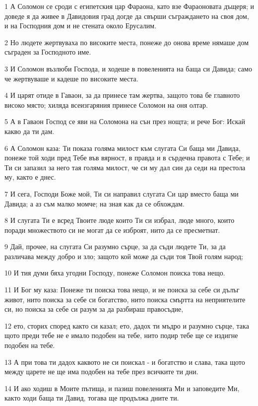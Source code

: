 \par 1 А Соломон се сроди с египетския цар Фараона, като взе Фараоновата дъщеря; и доведе я да живее в Давидовия град догде да свърши съграждането на своя дом, и на Господния дом и не стената около Ерусалим.
\par 2 Но людете жертвуваха по високите места, понеже до онова време нямаше дом съграден за Господното име.
\par 3 И Соломон възлюби Господа, и ходеше в повеленията на баща си Давида; само че жертвуваше и кадеше по високите места.
\par 4 И царят отиде в Гаваон, за да принесе там жертва, защото това бе главното високо място; хиляда всеизгаряния принесе Соломон на оня олтар.
\par 5 А в Гаваон Господ се яви на Соломона на сън през нощта; и рече Бог: Искай какво да ти дам.
\par 6 А Соломон каза: Ти показа голяма милост към слугата Си баща ми Давида, понеже той ходи пред Тебе във вярност, в правда и в сърдечна правота с Тебе; и Ти си запазил за него тая голяма милост, че си му дал син да седи на престола му, както е днес.
\par 7 И сега, Господи Боже мой, Ти си направил слугата Си цар вместо баща ми Давида; а аз съм малко момче; на зная как да се обхождам.
\par 8 И слугата Ти е всред Твоите люде които Ти си избрал, люде много, които поради множеството си не могат да се изброят, нито да се пресметнат.
\par 9 Дай, прочее, на слугата Си разумно сърце, за да съди людете Ти, за да различава между добро и зло; защото кой може да съди тоя Твой голям народ;
\par 10 И тия думи бяха угодни Господу, понеже Соломон поиска това нещо.
\par 11 И Бог му каза: Понеже ти поиска това нещо, и не поиска за себе си дълъг живот, нито поиска за себе си богатство, нито поиска смъртта на неприятелите си, но поиска за себе си разум за да разбираш правосъдие,
\par 12 ето, сторих според както си казал; ето, дадох ти мъдро и разумно сърце, така щото преди тебе не е имало подобен на тебе, нито подир тебе ще се издигне подобен на тебе.
\par 13 А при това ти дадох каквото не си поискал - и богатство и слава, така щото между царете не ще има подобен на тебе през всичките ти дни.
\par 14 И ако ходиш в Моите пътища, и пазиш повеленията Ми и заповедите Ми, както ходи баща ти Давид, тогава ще продължа дните ти.
